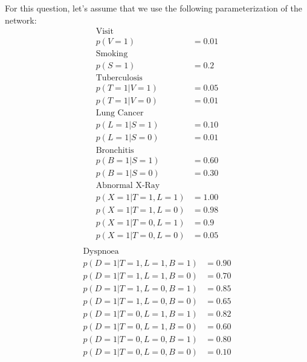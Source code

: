 \documentclass{article}
\begin{document}
For this question, let's assume that we use the following parameterization of the network:
\begin{align*}
\text{Visit}\\
p(V = 1) & = 0.01\\
\text{Smoking}\\
p(S = 1) & = 0.2\\
\text{Tuberculosis}\\
p(T = 1 | V = 1) & = 0.05\\
p(T = 1 | V = 0) & = 0.01\\
\text{Lung Cancer}\\
p(L = 1 | S = 1) & = 0.10\\
p(L = 1 | S = 0) & = 0.01\\
\text{Bronchitis}\\
p(B = 1 | S = 1) & = 0.60\\
p(B = 1 | S = 0) & = 0.30\\
\text{Abnormal X-Ray}\\
p(X = 1 | T = 1, L = 1) & = 1.00\\
p(X = 1 | T = 1, L = 0) & = 0.98\\
p(X = 1 | T = 0, L = 1) & = 0.9\\
p(X = 1 | T = 0, L = 0) & = 0.05\\
\end{align*}
\begin{align*}
\text{Dyspnoea}\\
p(D = 1 | T = 1, L = 1, B = 1) & = 0.90\\
p(D = 1 | T = 1, L = 1, B = 0) & = 0.70\\
p(D = 1 | T = 1, L = 0, B = 1) & = 0.85\\
p(D = 1 | T = 1, L = 0, B = 0) & = 0.65\\
p(D = 1 | T = 0, L = 1, B = 1) & = 0.82\\
p(D = 1 | T = 0, L = 1, B = 0) & = 0.60\\
p(D = 1 | T = 0, L = 0, B = 1) & = 0.80\\
p(D = 1 | T = 0, L = 0, B = 0) & = 0.10\\
\end{align*}
\end{document}
